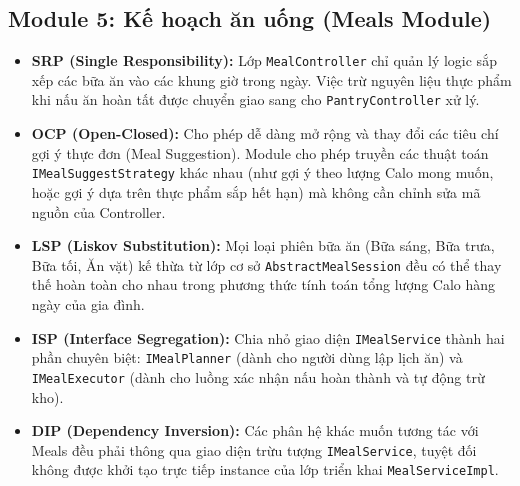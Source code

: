\documentclass[12pt,a4paper]{article}
\begin{document}
\subsection{Module 5: Kế hoạch ăn uống (Meals Module)}
\begin{itemize}
    \item \textbf{SRP (Single Responsibility):} Lớp \texttt{MealController} chỉ quản lý logic sắp xếp các bữa ăn vào các khung giờ trong ngày. Việc trừ nguyên liệu thực phẩm khi nấu ăn hoàn tất được chuyển giao sang cho \texttt{PantryController} xử lý.
    \item \textbf{OCP (Open-Closed):} Cho phép dễ dàng mở rộng và thay đổi các tiêu chí gợi ý thực đơn (Meal Suggestion). Module cho phép truyền các thuật toán \texttt{IMealSuggestStrategy} khác nhau (như gợi ý theo lượng Calo mong muốn, hoặc gợi ý dựa trên thực phẩm sắp hết hạn) mà không cần chỉnh sửa mã nguồn của Controller.
    \item \textbf{LSP (Liskov Substitution):} Mọi loại phiên bữa ăn (Bữa sáng, Bữa trưa, Bữa tối, Ăn vặt) kế thừa từ lớp cơ sở \texttt{AbstractMealSession} đều có thể thay thế hoàn toàn cho nhau trong phương thức tính toán tổng lượng Calo hàng ngày của gia đình.
    \item \textbf{ISP (Interface Segregation):} Chia nhỏ giao diện \texttt{IMealService} thành hai phần chuyên biệt: \texttt{IMealPlanner} (dành cho người dùng lập lịch ăn) và \texttt{IMealExecutor} (dành cho luồng xác nhận nấu hoàn thành và tự động trừ kho).
    \item \textbf{DIP (Dependency Inversion):} Các phân hệ khác muốn tương tác với Meals đều phải thông qua giao diện trừu tượng \texttt{IMealService}, tuyệt đối không được khởi tạo trực tiếp instance của lớp triển khai \texttt{MealServiceImpl}.
\end{itemize}
\end{document}
